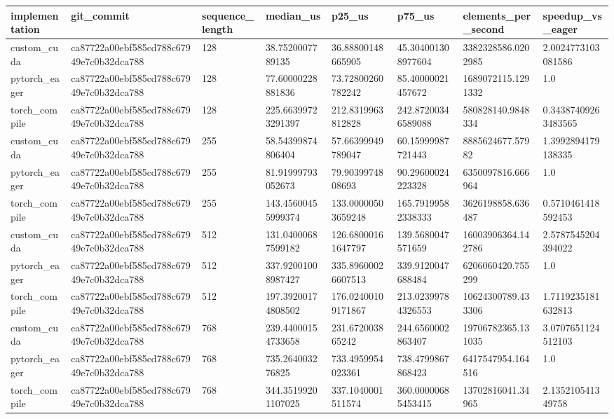 \begin{tabular}{llllllll}
\hline
implementation & git\_commit & sequence\_length & median\_us & p25\_us & p75\_us & elements\_per\_second & speedup\_vs\_eager \\
\hline
custom\_cuda & ca87722a00ebf585cd788c67949e7c0b32dca788 & 128 & 38.7520007789135 & 36.88800148665905 & 45.304001308977604 & 3382328586.0202985 & 2.0024773103081586 \\
pytorch\_eager & ca87722a00ebf585cd788c67949e7c0b32dca788 & 128 & 77.60000228881836 & 73.72800260782242 & 85.40000021457672 & 1689072115.1291332 & 1.0 \\
torch\_compile & ca87722a00ebf585cd788c67949e7c0b32dca788 & 128 & 225.66399723291397 & 212.8319963812828 & 242.87200346589088 & 580828140.9848334 & 0.34387409263483565 \\
custom\_cuda & ca87722a00ebf585cd788c67949e7c0b32dca788 & 255 & 58.54399874806404 & 57.66399949789047 & 60.15999987721443 & 8885624677.57982 & 1.3992894179138335 \\
pytorch\_eager & ca87722a00ebf585cd788c67949e7c0b32dca788 & 255 & 81.91999793052673 & 79.9039974808693 & 90.29600024223328 & 6350097816.666964 & 1.0 \\
torch\_compile & ca87722a00ebf585cd788c67949e7c0b32dca788 & 255 & 143.45600455999374 & 133.00000503659248 & 165.79199582338333 & 3626198858.636487 & 0.5710461418592453 \\
custom\_cuda & ca87722a00ebf585cd788c67949e7c0b32dca788 & 512 & 131.04000687599182 & 126.68000161647797 & 139.5680047571659 & 16003906364.142786 & 2.5787545204394022 \\
pytorch\_eager & ca87722a00ebf585cd788c67949e7c0b32dca788 & 512 & 337.92001008987427 & 335.89600026607513 & 339.9120047688484 & 6206060420.755299 & 1.0 \\
torch\_compile & ca87722a00ebf585cd788c67949e7c0b32dca788 & 512 & 197.39200174808502 & 176.02400109171867 & 213.02399784326553 & 10624300789.433306 & 1.7119235181632813 \\
custom\_cuda & ca87722a00ebf585cd788c67949e7c0b32dca788 & 768 & 239.44000154733658 & 231.672003865242 & 244.6560002863407 & 19706782365.131035 & 3.0707651124512103 \\
pytorch\_eager & ca87722a00ebf585cd788c67949e7c0b32dca788 & 768 & 735.264003276825 & 733.4959954023361 & 738.4799867868423 & 6417547954.164516 & 1.0 \\
torch\_compile & ca87722a00ebf585cd788c67949e7c0b32dca788 & 768 & 344.35199201107025 & 337.1040001511574 & 360.00000685453415 & 13702816041.34965 & 2.135210541349758 \\

\end{tabular}
